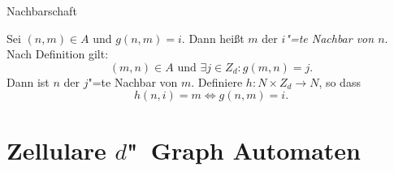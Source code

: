 \documentclass[18pt]{beamer}
\newcommand{\defWord}[1]{\emph{#1}}
\begin{document}
\begin{frame}{Nachbarschaft}
	\begin{definition}[Nachbarschaft]
		Sei $\left(n, m\right) \in A$ und $g\left(n, m\right) = i$. 
		Dann heißt $m$ der \defWord{$i$"=te Nachbar von $n$}.
		Nach Definition gilt: 
		\begin{displaymath}
		\left(m, n\right) \in A \text{ und }\exists j \in Z_d : g(m, n) = j.
		\end{displaymath}
		Dann ist $n$ der $j$"=te Nachbar von $m$. 
		Definiere $h : N \times Z_d \rightarrow N$, so dass
		\begin{displaymath}
		h(n, i) = m \iff g(n, m) = i.
		\end{displaymath}
	\end{definition}
\end{frame}

\section{Zellulare $d$"~Graph Automaten}
\end{document}
